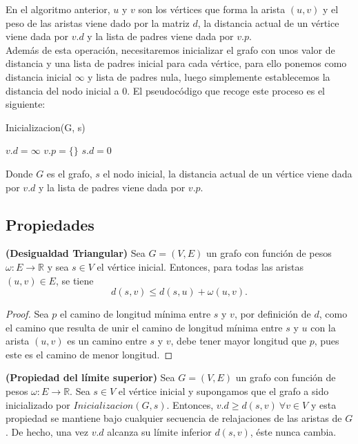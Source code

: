 En el algoritmo anterior, $u$ y $v$ son los vértices que forma la arista $(u,v)$ y el peso de las aristas viene dado por la matriz $d$, la distancia actual de un vértice viene dada por $v.d$ y la lista de padres viene dada por $v.p$. \\

Además de esta operación, necesitaremos inicializar el grafo con unos valor de distancia y una lista de padres inicial para cada vértice, para ello ponemos como distancia inicial $\infty$ y lista de padres nula, luego simplemente establecemos la distancia del nodo inicial a $0$. El pseudocódigo que recoge este proceso es el siguiente:

\begin{breakablealgorithm}
	\caption{Inicializacion(G, s)}
	\begin{algorithmic}[1]
			\State $v.d = \infty$
			\State $v.p = \{\}$
		\EndFor
		\State $s.d = 0$
	\end{algorithmic}
\end{breakablealgorithm}

Donde $G$ es el grafo, $s$ el nodo inicial, la distancia actual de un vértice viene dada por $v.d$ y la lista de padres viene dada por $v.p$. \\

\subsection{Propiedades}

\begin{lema}\label{lema:des_tri}
	\textbf{(Desigualdad Triangular)} Sea $G=(V,E)$ un grafo con función de pesos $\omega : E\rightarrow \mathbb{R}$ y sea $s\in V$ el vértice inicial. Entonces, para todas las aristas $(u,v)\in E$, se tiene
	$$d(s,v)\leq d(s,u)+\omega (u,v).$$
\end{lema}

\begin{proof}
	Sea $p$ el camino de longitud mínima entre $s$ y $v$, por definición de $d$, como el camino que resulta de unir el camino de longitud mínima entre $s$ y $u$ con la arista $(u,v)$ es un camino entre $s$ y $v$, debe tener mayor longitud que $p$, pues este es el camino de menor longitud.
\end{proof}

\begin{lema}\label{lema:lim_sup}
	\textbf{(Propiedad del límite superior)} Sea $G=(V,E)$ un grafo con función de pesos $\omega : E\rightarrow \mathbb{R}$. Sea $s\in V$ el vértice inicial y supongamos que el grafo a sido inicializado por $Inicializacion(G,s)$. Entonces, $v.d \geq d(s,v)\ \forall v\in V$ y esta propiedad se mantiene bajo cualquier secuencia de relajaciones de las aristas de $G$. De hecho, una vez $v.d$ alcanza su límite inferior $d(s,v)$, éste nunca cambia.
\end{lema}

